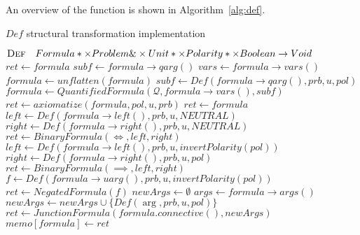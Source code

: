 An overview of the  function is shown in Algorithm~\ref{alg:def}.

\begin{algorithm}[H]
  \caption{\(Def\) structural transformation implementation}\label{alg:def}
    \begin{algorithmic}[1]
        \Statex{}  \(\textsc{Def}\quad Formula*\times Problem\&\times Unit*\times Polarity*\times Boolean\to Void\)
            \State{} \(ret \gets formula\)
              \State{} 
            \EndIf{}
              \Case{\(\forall,\exists\)}
                \State{} \(subf \gets formula\to qarg()\)
                \State{} \(vars \gets formula\to vars()\)
                \State{} \(formula \gets unflatten(formula)\)
                \State{} \(subf \gets Def(formula\to qarg(),prb,u,pol)\)
                \State{} \(formula \gets QuantifiedFormula(\mathcal{Q},formula\to vars(),subf)\)
                  \State{} \(ret \gets axiomatize(formula, pol, u, prb)\)
                \Else{}
                  \State{} \(ret \gets formula\)
                \EndIf{}
              \EndCase{}
              \Case{\(\iff\)}
                \State{} \(left \gets Def(formula\to left(), prb,u,NEUTRAL)\)
                \State{} \(right \gets Def(formula\to right(), prb,u,NEUTRAL)\)
                \State{} \(ret \gets BinaryFormula(\iff,left,right)\)
              \EndCase{}
              \Case{\(\implies\)}
                \State{} \(left \gets Def(formula\to left(), prb,u,invertPolarity(pol))\)
                \State{} \(right \gets Def(formula\to right(), prb,u,pol)\)
                \State{} \(ret \gets BinaryFormula(\implies,left,right)\)
              \EndCase{}
              \Case{\(\neg\)}
                \State{} \(f \gets Def(formula\to uarg(),prb,u,invertPolarity(pol))\)
                \State{} \(ret \gets NegatedFormula(f)\)
              \EndCase{}
              \Case{\(\lor, \land\)}
                \State{} \(newArgs \gets \emptyset\)
                \State{} \(args \gets formula\to args()\)
                  \State{} \(newArgs \gets newArgs \cup \{Def(\arg,prb,u,pol)\}\)
                \EndFor{}
                \State{} \(ret \gets JunctionFormula(formula.connective(),newArgs)\)
              \EndCase{}
            \EndSwitch{}
            \State{} \(memo[formula] \gets ret\)
            \State{} 
        \EndFunction{}
    \end{algorithmic}
\end{algorithm}

